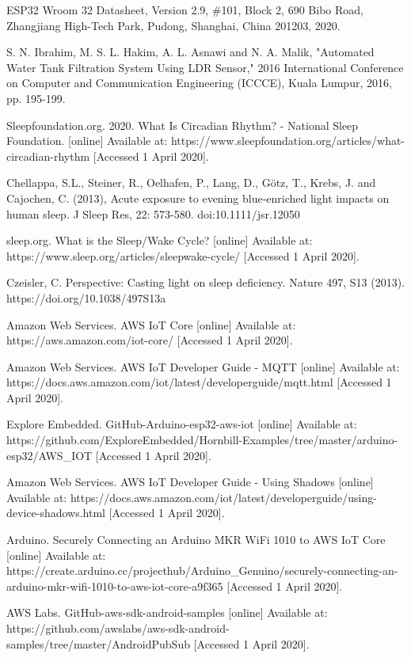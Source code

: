 \documentclass[conference]{IEEEtran}
\begin{document}
\begin{thebibliography}{9}

 ESP32 Wroom 32 Datasheet, Version 2.9, \#101, Block 2, 690 Bibo Road, Zhangjiang High-Tech Park, Pudong, Shanghai, China 201203, 2020. 

 S. N. Ibrahim, M. S. L. Hakim, A. L. Asnawi and N. A. Malik, "Automated Water Tank Filtration System Using LDR Sensor," 2016 International Conference on Computer and Communication Engineering (ICCCE), Kuala Lumpur, 2016, pp. 195-199. 

 Sleepfoundation.org. 2020. What Is Circadian Rhythm? - National Sleep Foundation. [online] Available at: https://www.sleepfoundation.org/articles/what-circadian-rhythm [Accessed 1 April 2020].

 Chellappa, S.L., Steiner, R., Oelhafen, P., Lang, D., Götz, T., Krebs, J. and Cajochen, C. (2013), Acute exposure to evening blue‐enriched light impacts on human sleep. J Sleep Res, 22: 573-580. doi:10.1111/jsr.12050

 sleep.org. What is the Sleep/Wake Cycle? [online] Available at: https://www.sleep.org/articles/sleepwake-cycle/  [Accessed 1 April 2020].

 Czeisler, C. Perspective: Casting light on sleep deficiency. Nature 497, S13 (2013). https://doi.org/10.1038/497S13a

 Amazon Web Services. AWS IoT Core [online] Available at: https://aws.amazon.com/iot-core/ [Accessed 1 April 2020].

  Amazon Web Services. AWS IoT Developer Guide - MQTT [online] Available at: https://docs.aws.amazon.com/iot/latest/developerguide/mqtt.html [Accessed 1 April 2020].

 Explore Embedded. GitHub-Arduino-esp32-aws-iot [online] Available at: https://github.com/ExploreEmbedded/Hornbill-Examples/tree/master/arduino-esp32/AWS\_IOT [Accessed 1 April 2020].

 Amazon Web Services. AWS IoT Developer Guide - Using Shadows [online] Available at: https://docs.aws.amazon.com/iot/latest/developerguide/using-device-shadows.html [Accessed 1 April 2020].

 Arduino. Securely Connecting an Arduino MKR WiFi 1010 to AWS IoT Core [online] Available at: https://create.arduino.cc/projecthub/Arduino\_Genuino/securely-connecting-an-arduino-mkr-wifi-1010-to-aws-iot-core-a9f365  [Accessed 1 April 2020].

 AWS Labs. GitHub-aws-sdk-android-samples [online] Available at: https://github.com/awslabs/aws-sdk-android-samples/tree/master/AndroidPubSub [Accessed 1 April 2020].

\end{thebibliography}
\vspace{12pt}
\end{document}

